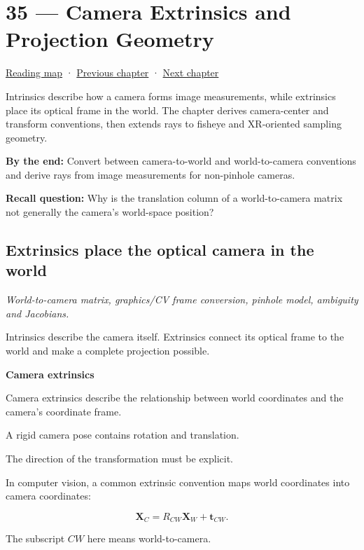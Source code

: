 \hypertarget{02-foundations-ii-ch035}{}
\section{35 --- Camera Extrinsics and Projection Geometry}\label{camera-extrinsics-and-projection-geometry}

\href{Chapter\%20Edition/01\%20-\%20Computing\%20Foundations/00\%20-\%20Reading\%20Map}{Reading map} · \hyperref[02-foundations-ii-ch034]{Previous chapter} · \hyperref[02-foundations-ii-ch036]{Next chapter}

Intrinsics describe how a camera forms image measurements, while extrinsics place its optical frame in the world. The chapter derives camera-center and transform conventions, then extends rays to fisheye and XR-oriented sampling geometry.

\textbf{By the end:} Convert between camera-to-world and world-to-camera conventions and derive rays from image measurements for non-pinhole cameras.

\textbf{Recall question:} Why is the translation column of a world-to-camera matrix not generally the camera's world-space position?

\subsection{Extrinsics place the optical camera in the world}\label{extrinsics-place-the-optical-camera-in-the-world}

\emph{World-to-camera matrix, graphics/CV frame conversion, pinhole model, ambiguity and Jacobians.}

Intrinsics describe the camera itself. Extrinsics connect its optical frame to the world and make a complete projection possible.

\textbf{Camera extrinsics}

Camera extrinsics describe the relationship between world coordinates and the camera's coordinate frame.

A rigid camera pose contains rotation and translation.

The direction of the transformation must be explicit.

In computer vision, a common extrinsic convention maps world coordinates into camera coordinates:

\[
 \boxed{ \mathbf X_C=R_{CW}\mathbf X_W+\mathbf t_{CW} }.
\]

The subscript \(CW\) here means world-to-camera.

